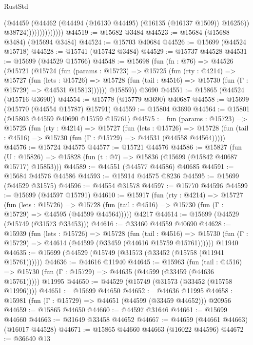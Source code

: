 \begin{lexlean}{RustStd}
\begin{coremodule}
                              (@44459
                                (@44462 (@44494 (@16130 @44495) (@16135 (@16137 @1509)) @16256))
                                @38724))))))))))))))
@44519 := @15682 @3484
@44523 := @15684 (@15688 @3484) (@15694 @3484)
@44524 := @15703 @40684
@44526 := @15699 (@44524 @15718)
@44528 := @15741 (@15742 @3484)
@44529 := @15737 @44528
@44531 := @15699 (@44529 @15766)
@44548 := @15698
    (fun (fn : @76) =>
    @44526
      (@15721
        (@15724
          (fun (params : @15723) =>
          @15725
            (fun (rty : @4214) =>
            @15727
              (fun (lets : @15726) =>
              @15728 (fun (tail : @4516) => @15730 (fun (Γ : @15729) => @44531 @15813))))))
        @15859))
    @3690
@44551 := @15865 (@44524 (@15716 @3690))
@44554 := @15778 (@15779 @3690) @40687
@44558 := @15699 (@15770 (@44554 @15787) @15791)
@44559 := @15804 @3690
@44564 := @15801 (@15803 @44559 @40690 @15759 @15761)
@44575 := fun (params : @15723) =>
  @15725
    (fun (rty : @4214) =>
    @15727
      (fun (lets : @15726) =>
      @15728 (fun (tail : @4516) => @15730 (fun (Γ : @15729) => @44531 (@44558 @44564)))))
@44576 := @15724 @44575
@44577 := @15721 @44576
@44586 := @15827
    (fun (U : @15826) => @15828 (fun (t : @7) => @15836 (@15699 (@15842 @40687 @15717) @15853)))
@44589 := @44551 (@44577 @44586) @40685
@44591 := @15684 @44576 @44586
@44593 := @15914 @44575 @8236
@44595 := @15699 (@44529 @31575)
@44596 := @44554 @31578
@44597 := @15770 @44596
@44599 := @15699 (@44597 @15791)
@44610 := @15917
    (fun (rty : @4214) =>
    @15727
      (fun (lets : @15726) =>
      @15728 (fun (tail : @4516) => @15730 (fun (Γ : @15729) => @44595 (@44599 @44564)))))
    @4217
@44614 := @15699 (@44529 (@15749 (@31573 @33453)))
@44616 := @33460 @44559 @40690
@44628 := @15939
    (fun (lets : @15726) =>
    @15728
      (fun (tail : @4516) =>
      @15730 (fun (Γ : @15729) => @44614 (@44599 (@33459 (@44616 @15759 @15761))))))
    @11940
@44635 := @15699 (@44529 (@15749 (@31573 (@33452 (@15758 (@11941 @15761))))))
@44636 := @44616 @11940
@44645 := @15963
    (fun (tail : @4516) => @15730 (fun (Γ : @15729) => @44635 (@44599 (@33459 (@44636 @15761)))))
    @11995
@44650 := @44529 (@15749 (@31573 (@33452 (@15758 @11996))))
@44651 := @15699 @44650
@44652 := @44636 @11995
@44658 := @15981 (fun (Γ : @15729) => @44651 (@44599 (@33459 @44652))) @20956
@44659 := @15865 @44650
@44660 := @44597 @31646
@44661 := @15699 @44660
@44663 := @31649 @33458 @44652
@44667 := @44659 (@44661 @44663) (@16017 @44528)
@44671 := @15865 @44660 @44663 (@16022 @44596)
@44672 := @36640 @13

\end{coremodule}
\end{lexlean}
